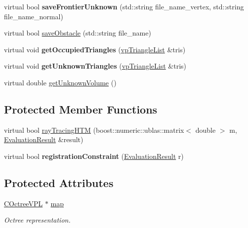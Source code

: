 \begin{DoxyCompactItemize}
\item 
virtual bool {\bfseries save\+Frontier\+Unknown} (std\+::string file\+\_\+name\+\_\+vertex, std\+::string file\+\_\+name\+\_\+normal)\hypertarget{classPMVOctree_ae311223977861d14ac9bc97f77194448}{}\label{classPMVOctree_ae311223977861d14ac9bc97f77194448}

\item 
virtual bool \hyperlink{classPMVOctree_a4a6e07836f0258cd32d5bcb89867ae03}{save\+Obstacle} (std\+::string file\+\_\+name)
\item 
virtual void {\bfseries get\+Occupied\+Triangles} (\hyperlink{classvpTriangleList}{vp\+Triangle\+List} \&tris)\hypertarget{classPMVOctree_a963e41d16ae7a3b37baf64e1c309e35f}{}\label{classPMVOctree_a963e41d16ae7a3b37baf64e1c309e35f}

\item 
virtual void {\bfseries get\+Unknown\+Triangles} (\hyperlink{classvpTriangleList}{vp\+Triangle\+List} \&tris)\hypertarget{classPMVOctree_a1e9af592a9b42e7330c34faa7fec748a}{}\label{classPMVOctree_a1e9af592a9b42e7330c34faa7fec748a}

\item 
virtual double \hyperlink{classPMVOctree_a55c27c46a523772761512e1f139802ba}{get\+Unknown\+Volume} ()
\end{DoxyCompactItemize}
\subsection*{Protected Member Functions}
\begin{DoxyCompactItemize}
\item 
virtual bool \hyperlink{classPMVOctree_a7f3ca384e40ac57446ec20d9acbefa92}{ray\+Tracing\+H\+TM} (boost\+::numeric\+::ublas\+::matrix$<$ double $>$ m, \hyperlink{classEvaluationResult}{Evaluation\+Result} \&result)
\item 
virtual bool {\bfseries registration\+Constraint} (\hyperlink{classEvaluationResult}{Evaluation\+Result} r)\hypertarget{classPMVOctree_a5fb49eeca15fa16a47d6568b592ae76d}{}\label{classPMVOctree_a5fb49eeca15fa16a47d6568b592ae76d}

\end{DoxyCompactItemize}
\subsection*{Protected Attributes}
\begin{DoxyCompactItemize}
\item 
\hyperlink{classCOctreeVPL}{C\+Octree\+V\+PL} $\ast$ \hyperlink{classPMVOctree_a922c0a5e617d067b2088372fdab2d9dd}{map}\hypertarget{classPMVOctree_a922c0a5e617d067b2088372fdab2d9dd}{}\label{classPMVOctree_a922c0a5e617d067b2088372fdab2d9dd}

\begin{DoxyCompactList}\small\item\em Octree representation. \end{DoxyCompactList}\end{DoxyCompactItemize}
